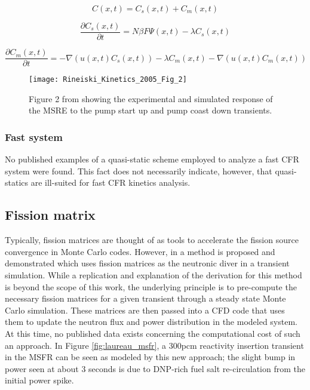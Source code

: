 \documentclass[review]{elsarticle}
\begin{document}
\begin{equation}
    \label{eq:spk_uni}
    C(x,t) = C_{s}(x,t) + C_{m}(x,t)
\end{equation}

\begin{equation}
    \label{eq:spk_static}
    \frac{\partial C_{s}(x,t)}{\partial t} = N \beta F \Psi(x,t) -
        \lambda C_{s}(x,t)
\end{equation}
 
\begin{equation}
    \label{eq:spk_move}
    \frac{\partial C_{m}(x,t)}{\partial t} = - \nabla (u(x,t) C_{s}(x,t)) -
        \lambda C_{m}(x,t) - \nabla(u(x,t) C_{m}(x,t))
\end{equation}

\begin{figure}[h]
   \centering
   \texttt{[image: Rineiski\_Kinetics\_2005\_Fig\_2]}
   \caption{Figure 2 from \cite{rineiski_kinetics_2005} showing the experimental and simulated
   response of the MSRE to the pump start up and pump coast down transients.} 
   \label{fig:rineiski_msre_ps}
\end{figure}

\subsubsection{Fast system} \label{sssec:qs_fast}
No published examples of a quasi-static scheme employed to analyze a fast
CFR system were found. This fact  does not necessarily indicate, however, that
quasi-statics are ill-suited for fast CFR kinetics analysis.

\subsection{Fission matrix}
Typically, fission matrices are thought of as tools to accelerate the fission
source convergence in Monte Carlo codes. However, in 
\cite{laureau_coupled_2015} a method is proposed and demonstrated which uses
fission matrices as the neutronic diver in a transient simulation. While a
replication and explanation of the derivation for this method is beyond the
scope of this work, the underlying principle is to pre-compute the necessary
fission matrices for a given transient through a steady state Monte Carlo
simulation. These matrices are then passed into a CFD code that uses them
to update the neutron flux and power distribution in the modeled system. At
this time, no published data exists concerning the computational cost
of such an approach. In Figure \ref{fig:laureau_msfr}, a 300pcm reactivity
insertion transient in the MSFR can be seen as modeled by this new approach; the
slight bump in power seen at about 3 seconds is due to DNP-rich fuel salt
re-circulation from the initial power spike.
\end{document}
